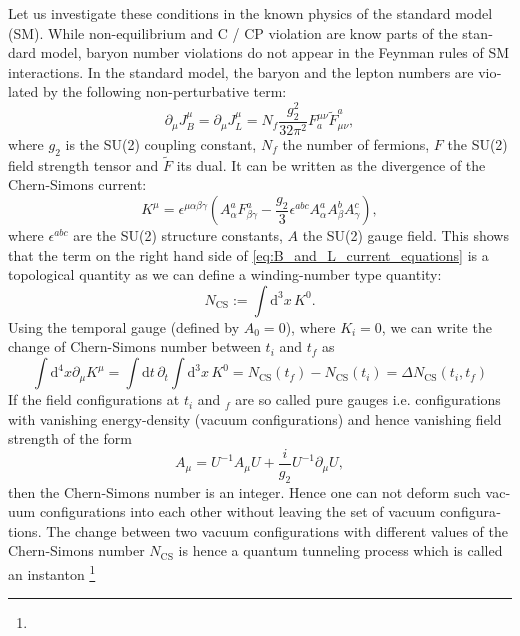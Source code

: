 \documentclass[master,       %
               twoside,        %
               BCOR10mm,       %
               english,ngerman, %
               ]{GAUBM}
\begin{document}
\begin{otherlanguage}{english}
Let us investigate these conditions in the known physics of the standard model (SM). While non-equilibrium and C / CP violation are know parts of the standard model, baryon number violations do not appear in the Feynman rules of SM interactions. In the standard model, the baryon and the lepton numbers are violated by the following non-perturbative term:
\begin{equation}
	\label{eq:B_and_L_current_equations}
	\partial_\mu J^\mu_B = \partial_\mu J^\mu_L = N_f \frac{g_2^2}{32 \pi^2} F^{\mu \nu}_a \tilde{F}_{\mu \nu}^a,
\end{equation}
where $g_2$ is the SU(2) coupling constant, $N_f$ the number of fermions, $F$ the SU(2) field strength tensor and $\tilde{F}$ its dual.
It can be written as the divergence of the Chern-Simons current:
\begin{equation}
	\label{eq:chern_simons_current}
	K^\mu = \epsilon^{\mu \alpha \beta \gamma} \left( A^a_\alpha F^a_{\beta \gamma} - \frac{g_2}{3} \epsilon^{abc} A^a_\alpha A^b_\beta A^c_\gamma \right),
\end{equation}
where $\epsilon^{abc}$ are the SU(2) structure constants, $A$ the SU(2) gauge field.
This shows that the term on the right hand side of \eqref{eq:B_and_L_current_equations} is a topological quantity as we can define a winding-number type quantity:
\begin{equation}
	N_{\mathrm{CS}} := \int \mathrm{d}^3 x \, K^0.
\end{equation}
Using the temporal gauge (defined by $A_0 = 0$), where $K_i = 0$,
we can write the change of Chern-Simons number between $t_i$ and $t_f$ as
\begin{equation}
	\int \mathrm{d}^4 x \partial_\mu K^\mu = \int \mathrm{d} t \, \partial_t \int \mathrm{d}^3 x \, K^0 =
	N_{\mathrm{CS}}(t_f) - N_{\mathrm{CS}}(t_i) = \Delta N_{\mathrm{CS}}(t_i, t_f)
\end{equation}
If the field configurations at $t_i$ and $_f$ are so called pure gauges i.e. configurations with vanishing energy-density (vacuum configurations) and hence vanishing field strength of the form
\begin{equation}
	A_\mu = U^{-1} A_\mu U + \frac{i}{g_2} U^{-1} \partial_\mu U,
\end{equation}
then the Chern-Simons number is an integer.
Hence one can not deform such vacuum configurations into each other without leaving the set of vacuum configurations.
The change between two vacuum configurations with different values of the Chern-Simons number $N_\mathrm{CS}$ is hence a quantum tunneling process which is called an instanton \footnote{
}
\end{otherlanguage}
\end{document}
